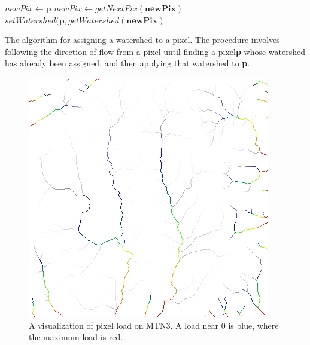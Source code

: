 \begin{algorithm}[t]
\begin{algorithmic}
    \STATE $newPix \gets \textbf{p}$
      \STATE $newPix \gets getNextPix( \textbf{newPix} )$
    \ENDWHILE
    \STATE $setWatershed( \textbf{p}, getWatershed( \textbf{newPix} )$
  \ENDFOR
\end{algorithmic}
\caption[The algorithm for assigning a watershed to a pixel]{\label{algorithm:WatershedClassification}The algorithm for assigning a watershed to a pixel. The procedure involves following the direction of flow from a pixel until finding a pixel\textbf{p} whose watershed has already been assigned, and then applying that watershed to \textbf{p}. }
\end{algorithm}

\begin{figure}[t]
\begin{minipage}[b]{0.9\linewidth}
\begin{center}
\includegraphics[width=\linewidth]{images/PixelImportance.jpg}
\end{center}
\end{minipage}
\caption[A visualization of pixel load on MTN3]{\label{figure:pixelLoadVisualization}A visualization of pixel load on MTN3. A load near 0 is blue, where the maximum load is red. }
\end{figure}


